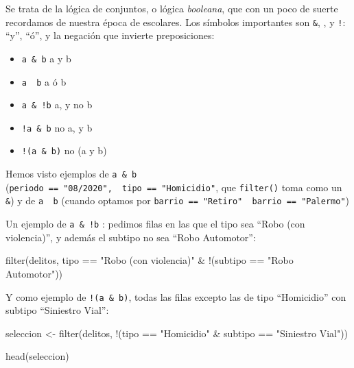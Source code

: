 \documentclass[
]{book}
\newenvironment{Shaded}{\begin{snugshade}}{\end{snugshade}}
\newcommand{\FunctionTok}[1]{\textcolor[rgb]{0.00,0.00,0.00}{#1}}
\newcommand{\NormalTok}[1]{#1}
\newcommand{\OtherTok}[1]{\textcolor[rgb]{0.56,0.35,0.01}{#1}}
\newcommand{\SpecialCharTok}[1]{\textcolor[rgb]{0.00,0.00,0.00}{#1}}
\newcommand{\StringTok}[1]{\textcolor[rgb]{0.31,0.60,0.02}{#1}}
\begin{document}
Se trata de la lógica de conjuntos, o lógica \emph{booleana}, que con un poco de suerte recordamos de nuestra época de escolares. Los símbolos importantes son \texttt{\&}, \texttt{\textbar{}}, y \texttt{!}: ``y'', ``ó'', y la negación que invierte preposiciones:

\begin{itemize}
\item
  \texttt{a\ \&\ b} a y b
\item
  \texttt{a\ \textbar{}\ b} a ó b
\item
  \texttt{a\ \&\ !b} a, y no b
\item
  \texttt{!a\ \&\ b} no a, y b
\item
  \texttt{!(a\ \&\ b)} no (a y b)
\end{itemize}

Hemos visto ejemplos de \texttt{a\ \&\ b} (\texttt{periodo\ ==\ "08/2020",\ \ tipo\ ==\ "Homicidio"}, que \texttt{filter()} toma como un \texttt{\&}) y de \texttt{a\ \textbar{}\ b} (cuando optamos por \texttt{barrio\ ==\ "Retiro"\ \textbar{}\ barrio\ ==\ "Palermo"})

Un ejemplo de \texttt{a\ \&\ !b} : pedimos filas en las que el tipo sea ``Robo (con violencia)'', y además el subtipo no sea ``Robo Automotor'':

\begin{Shaded}
\begin{Highlighting}[]
\FunctionTok{filter}\NormalTok{(delitos, tipo }\SpecialCharTok{==} \StringTok{"Robo (con violencia)"} \SpecialCharTok{\&} \SpecialCharTok{!}\NormalTok{(subtipo }\SpecialCharTok{==} \StringTok{"Robo Automotor"}\NormalTok{))}
\end{Highlighting}
\end{Shaded}

Y como ejemplo de \texttt{!(a\ \&\ b)}, todas las filas excepto las de tipo ``Homicidio'' con subtipo ``Siniestro Vial'':

\begin{Shaded}
\begin{Highlighting}[]
\NormalTok{seleccion }\OtherTok{\textless{}{-}} \FunctionTok{filter}\NormalTok{(delitos, }\SpecialCharTok{!}\NormalTok{(tipo }\SpecialCharTok{==} \StringTok{"Homicidio"} \SpecialCharTok{\&}\NormalTok{ subtipo }\SpecialCharTok{==} \StringTok{"Siniestro Vial"}\NormalTok{))}

\FunctionTok{head}\NormalTok{(seleccion)}
\end{Highlighting}
\end{Shaded}
\end{document}
